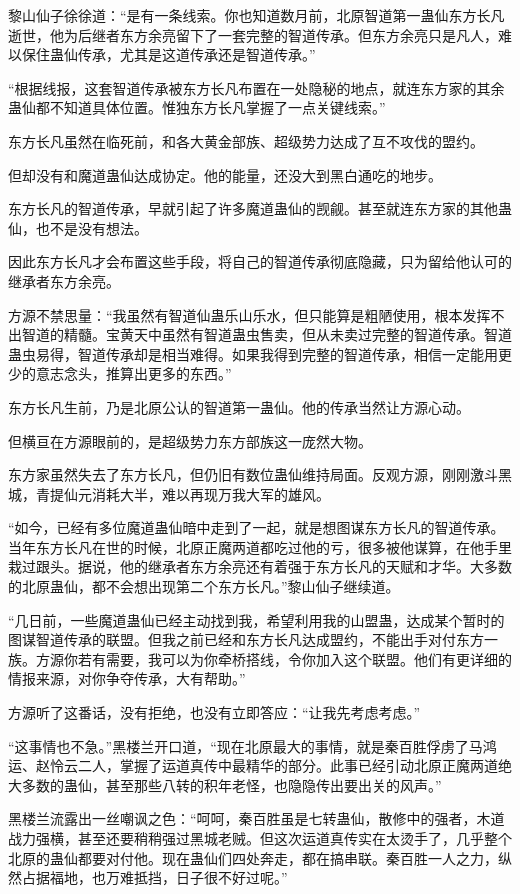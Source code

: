\begin{this_body}
黎山仙子徐徐道：“是有一条线索。你也知道数月前，北原智道第一蛊仙东方长凡逝世，他为后继者东方余亮留下了一套完整的智道传承。但东方余亮只是凡人，难以保住蛊仙传承，尤其是这道传承还是智道传承。”

“根据线报，这套智道传承被东方长凡布置在一处隐秘的地点，就连东方家的其余蛊仙都不知道具体位置。惟独东方长凡掌握了一点关键线索。”

东方长凡虽然在临死前，和各大黄金部族、超级势力达成了互不攻伐的盟约。

但却没有和魔道蛊仙达成协定。他的能量，还没大到黑白通吃的地步。

东方长凡的智道传承，早就引起了许多魔道蛊仙的觊觎。甚至就连东方家的其他蛊仙，也不是没有想法。

因此东方长凡才会布置这些手段，将自己的智道传承彻底隐藏，只为留给他认可的继承者东方余亮。

方源不禁思量：“我虽然有智道仙蛊乐山乐水，但只能算是粗陋使用，根本发挥不出智道的精髓。宝黄天中虽然有智道蛊虫售卖，但从未卖过完整的智道传承。智道蛊虫易得，智道传承却是相当难得。如果我得到完整的智道传承，相信一定能用更少的意志念头，推算出更多的东西。”

东方长凡生前，乃是北原公认的智道第一蛊仙。他的传承当然让方源心动。

但横亘在方源眼前的，是超级势力东方部族这一庞然大物。

东方家虽然失去了东方长凡，但仍旧有数位蛊仙维持局面。反观方源，刚刚激斗黑城，青提仙元消耗大半，难以再现万我大军的雄风。

“如今，已经有多位魔道蛊仙暗中走到了一起，就是想图谋东方长凡的智道传承。当年东方长凡在世的时候，北原正魔两道都吃过他的亏，很多被他谋算，在他手里栽过跟头。据说，他的继承者东方余亮还有着强于东方长凡的天赋和才华。大多数的北原蛊仙，都不会想出现第二个东方长凡。”黎山仙子继续道。

“几日前，一些魔道蛊仙已经主动找到我，希望利用我的山盟蛊，达成某个暂时的图谋智道传承的联盟。但我之前已经和东方长凡达成盟约，不能出手对付东方一族。方源你若有需要，我可以为你牵桥搭线，令你加入这个联盟。他们有更详细的情报来源，对你争夺传承，大有帮助。”

方源听了这番话，没有拒绝，也没有立即答应：“让我先考虑考虑。”

“这事情也不急。”黑楼兰开口道，“现在北原最大的事情，就是秦百胜俘虏了马鸿运、赵怜云二人，掌握了运道真传中最精华的部分。此事已经引动北原正魔两道绝大多数的蛊仙，甚至那些八转的积年老怪，也隐隐传出要出关的风声。”

黑楼兰流露出一丝嘲讽之色：“呵呵，秦百胜虽是七转蛊仙，散修中的强者，木道战力强横，甚至还要稍稍强过黑城老贼。但这次运道真传实在太烫手了，几乎整个北原的蛊仙都要对付他。现在蛊仙们四处奔走，都在搞串联。秦百胜一人之力，纵然占据福地，也万难抵挡，日子很不好过呢。”


\end{this_body}
